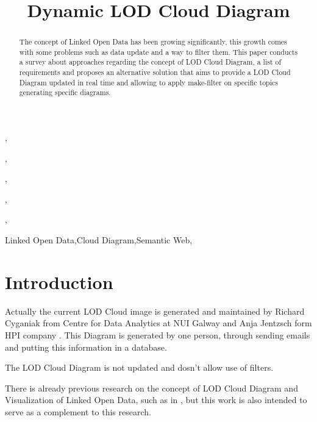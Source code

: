 \documentclass{iosart2c}
\begin{document}
\begin{frontmatter}                           %

%
\title{Dynamic LOD Cloud Diagram}


\author{ }
,
\author{ }
,
\author{ }
,
\author{ }
,
\author{ }
,
\author{ }
\address{AKSW/BIS Universitat Leipzig,\\ Germany\\
E-mail: \{cbaron, hellmann, esteves, arndt, valdestilhas\}@informatik.uni-leipzig.de}

\begin{abstract}
The concept of Linked Open Data has been growing significantly, this growth comes with some problems such as data update and a way to filter them. This paper conducts a survey about approaches regarding the concept of LOD Cloud Diagram, a list of requirements and proposes an alternative solution that aims to provide a LOD Cloud Diagram updated in real time and allowing to apply make-filter on specific topics generating specific diagrams.
\end{abstract}

\begin{keyword}
Linked Open Data\sep Cloud Diagram\sep Semantic Web\sep
\end{keyword}

\end{frontmatter}


\section{Introduction}
Actually the current LOD Cloud image is generated and maintained by Richard Cyganiak from Centre for Data Analytics at NUI Galway and Anja Jentzsch form HPI company \cite{lodcloud2014}.
This Diagram is generated by one person, through sending emails and putting this information in a database.

The LOD Cloud Diagram \cite{lodcloud} is not updated and dosn't allow use of filters.

There is already previous research on the concept of LOD Cloud Diagram and Visualization of Linked Open Data, such as in \cite{Dadzie2011, IJST38378}, but this work is also intended to serve as a complement to this research.
\end{document}
